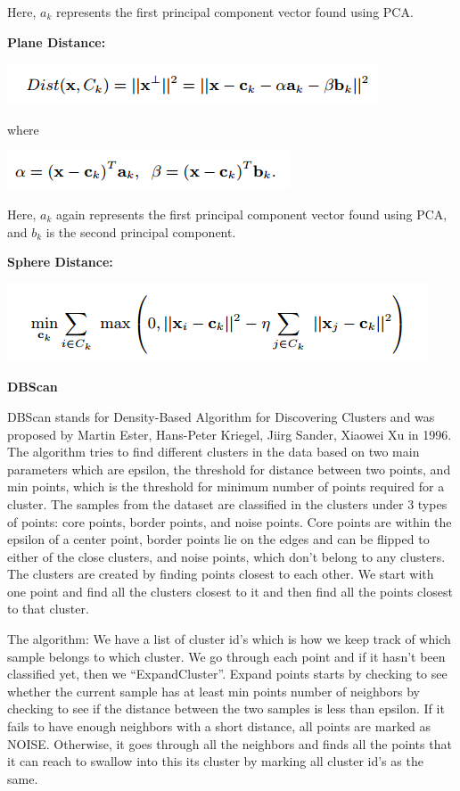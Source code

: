 \documentclass[12pt]{article}
\begin{document}
\begin{enumerate}
Here, $a_k$ represents the first principal component vector found using PCA.

\textbf{Plane Distance:}

\includegraphics[scale=0.75]{eq2.png}

where 

\includegraphics[scale=0.75]{eq22.png}

Here, $a_k$ again represents the first principal component vector found using PCA, and $b_k$ is the second principal component.

\smallskip

\textbf{Sphere Distance:}

\includegraphics[scale=0.75]{eq3.png}




\textbf{DBScan}

DBScan stands for  Density-Based Algorithm for Discovering Clusters and was proposed by Martin Ester, Hans-Peter Kriegel, Jiirg Sander, Xiaowei Xu in 1996. The algorithm tries to find different clusters in the data based on two main parameters which are epsilon, the threshold for distance between two points, and min points, which is the threshold for minimum number of points required for a cluster. The samples from the dataset are classified in the clusters under 3 types of points: core points, border points, and noise points. Core points are within the epsilon of a center point, border points lie on the edges and can be flipped  to either of the close clusters, and noise points, which don’t belong to any clusters. The clusters are created by finding points closest to each other. We start with one point and find all the clusters closest to it and then find all the points closest to that cluster.

The algorithm:
We have a list of cluster id’s which is how we keep track of which sample belongs to which cluster. We go through each point and if it hasn’t been classified yet, then we “ExpandCluster”. Expand points starts by checking to see whether the current sample has at least min points number of neighbors by checking to see if the distance between the two samples is less than epsilon. If it fails to have enough neighbors with a short distance, all points are marked as NOISE. Otherwise, it goes through all the neighbors and finds all the points that it can reach to swallow into this its cluster by marking all cluster id’s as the same.


\end{enumerate}
\end{document}
